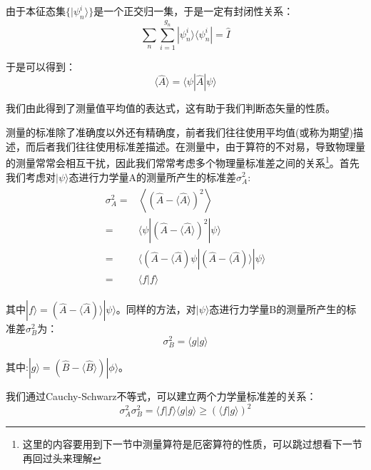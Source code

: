         由于本征态集$\{|\psi_n^i\rangle\}$是一个正交归一集，于是一定有封闭性关系：
        \begin{equation}
            \sum_n\sum_{i=1}^{g_n}|\psi_n^i\rangle\langle \psi_n^i|=\hat{I}
        \end{equation}
        
        于是可以得到：
        \begin{equation}
            \langle \hat{A}\rangle=\langle\psi|\hat{A}|\psi\rangle
        \end{equation}
        
        我们由此得到了测量值平均值的表达式，这有助于我们判断态矢量的性质。
        
        测量的标准除了准确度以外还有精确度，前者我们往往使用平均值(或称为期望)描述，而后者我们往往使用标准差描述。在测量中，由于算符的不对易，导致物理量的测量常常会相互干扰，因此我们常常考虑多个物理量标准差之间的关系\footnote{这里的内容要用到下一节中测量算符是厄密算符的性质，可以跳过想看下一节再回过头来理解}。首先我们考虑对$|\psi\rangle$态进行力学量A的测量所产生的标准差$\sigma_A^2$:
        \begin{align}
            \begin{split}
             \sigma_A^2=&\left\langle(\hat{A}-\langle\hat{A}\rangle)^2 \right\rangle\\
                =& \langle\psi|(\hat{A}-\langle\hat{A}\rangle)^2|\psi\rangle\\
                =&\langle(\hat{A}-\langle\hat{A})\psi|(\hat{A}-\langle\hat{A})\rangle|\psi\rangle\\
                =&\langle f|f\rangle
            \end{split}
        \end{align}
            
       其中$|f\rangle=(\hat{A}-\langle\hat{A})\rangle|\psi\rangle$。同样的方法，对$|\psi\rangle$态进行力学量B的测量所产生的标准差$\sigma_B^2$为：
       \begin{equation}
           \sigma_B^2=\langle g|g\rangle
       \end{equation}
       
       其中:$|g\rangle=(\hat{B}-\langle\hat{B}\rangle)|\phi\rangle$。
       
       我们通过Cauchy-Schwarz不等式，可以建立两个力学量标准差的关系：
       \begin{equation}
           \sigma_A^2\sigma_B^2=\langle f|f\rangle\langle g|g\rangle\geq (\langle f|g\rangle)^2
        \end{equation}

